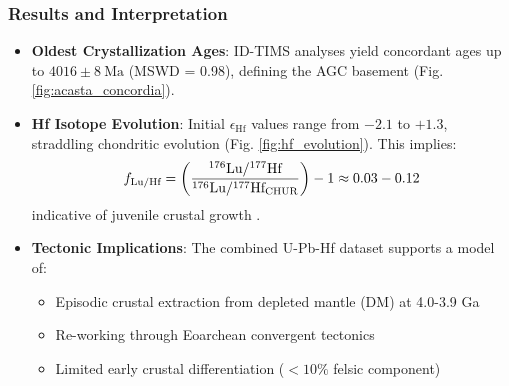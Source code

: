 \documentclass{article}
\begin{document}
\subsubsection*{Results and Interpretation}
\begin{itemize}
    \item \textbf{Oldest Crystallization Ages}:  
    ID-TIMS analyses yield concordant ages up to \(4016 \pm 8\ \text{Ma}\) (MSWD = 0.98), defining the AGC basement (Fig. \ref{fig:acasta_concordia}).

    \item \textbf{Hf Isotope Evolution}:  
    Initial \(\epsilon_{\text{Hf}}\) values range from \(-2.1\) to \(+1.3\), straddling chondritic evolution (Fig. \ref{fig:hf_evolution}). This implies:
    \begin{equation}
        f_{\text{Lu/Hf}} = \left(\frac{^{176}\text{Lu}/^{177}\text{Hf}}{^{176}\text{Lu}/^{177}\text{Hf}_{\text{CHUR}}}\right) - 1 \approx 0.03\--0.12
        \label{eq:f_luhf}
    \end{equation}
    indicative of juvenile crustal growth \cite{Vervoort2015}.

    \item \textbf{Tectonic Implications}:  
    The combined U-Pb-Hf dataset supports a model of:
    \begin{itemize}
        \item Episodic crustal extraction from depleted mantle (DM) at 4.0-3.9 Ga
        \item Re-working through Eoarchean convergent tectonics
        \item Limited early crustal differentiation (\(<10\%\) felsic component)
    \end{itemize}
\end{itemize}
\end{document}
